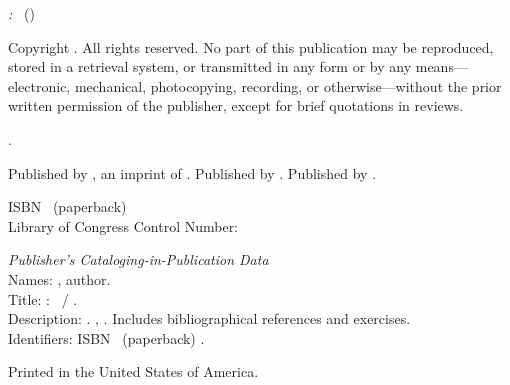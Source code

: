 \thispagestyle{empty}
\begingroup
\footnotesize
\setlength{\parindent}{0pt}
\setlength{\parskip}{0.6\baselineskip}
\null\vfill %

{\itshape\BookTitle\ifBookHasSubtitle: \BookSubtitle\fi}%
\ifBookHasEditionSuffix\ (\BookEditionSuffix)\fi

Copyright \textcopyright{} \BookYear{} \BookCopyrightHolder.
All rights reserved. No part of this publication may be reproduced,
stored in a retrieval system, or transmitted in any form or by any
means---electronic, mechanical, photocopying, recording, or
otherwise---without the prior written permission of the publisher,
except for brief quotations in reviews.

\BookEditionStatement.

\ifBookHasImprint
  \ifBookHasPublisher
    Published by \BookImprint, an imprint of \BookPublisher.
  \else
    Published by \BookImprint.
  \fi
\else
  \ifBookHasPublisher
    Published by \BookPublisher.
  \fi
\fi

\ifBookHasISBNPrint
  ISBN \BookISBNPrint\ (paperback)\\
\fi
{}%
%
\ifBookHasLCCN
  Library of Congress Control Number: \BookLCCN
\fi

\ifBookHasISBNPrint
  \emph{Publisher's Cataloging-in-Publication Data}\\
  Names: \BookAuthor, author.\\
  Title: \BookTitle\ifBookHasSubtitle{} : \BookSubtitle\fi\ / \BookAuthor.\\
  Description: \BookEditionStatement. \textbar{} \BookPublisher, \BookYear.
  \textbar{} Includes bibliographical references and exercises.\\
  Identifiers: ISBN \BookISBNPrint\ (paperback)%
  .
\fi

\ifBookHasAIDisclosure
  \BookAIDisclosure
\fi

Printed in the United States of America.

\endgroup
\cleardoublepage
